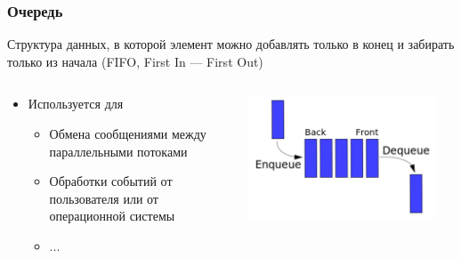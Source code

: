 \documentclass{../../slides-style}
\begin{document}
	\begin{frame}
		\frametitle{Очередь}
		Структура данных, в которой элемент можно добавлять только в конец и забирать только из начала (FIFO, First In --- First Out)
		\begin{columns}
			\begin{column}{0.6\textwidth}
				\begin{itemize}
					\item Используется для
					\begin{itemize}
						\item Обмена сообщениями между параллельными потоками
						\item Обработки событий от пользователя или от операционной системы
						\item ...
					\end{itemize}
				\end{itemize}
			\end{column}
			\begin{column}{0.4\textwidth}
				\begin{center}
					\includegraphics[width=0.9\textwidth]{queue.png}
				\end{center}
			\end{column}
		\end{columns}
	\end{frame}
\end{document}

